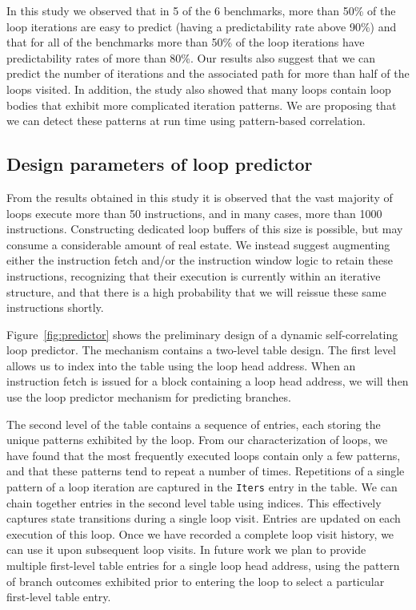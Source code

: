 \documentclass[times,10pt,twocolumn]{article}
\begin{document}
In this study we observed that in 5 of the 6 benchmarks, more than 
50\% of the loop iterations are easy to predict (having a predictability rate 
above 90\%) and that for all of the benchmarks more than 50\%
of the loop iterations have predictability rates of more than 80\%. Our 
results also suggest that we can predict the number of iterations
and the associated path for more than half of the loops visited.  
In addition, the study also showed that many loops contain loop bodies
that exhibit more complicated iteration patterns.  We are proposing 
that we can detect these patterns at run time using pattern-based
correlation.

\subsection{Design parameters of loop predictor} 

From the results obtained in this study it is observed that the vast 
majority of loops execute more than 50 instructions, and in many cases,
more than 1000 instructions. Constructing dedicated loop buffers of 
this size is possible, but may consume a considerable amount of real estate.
We instead suggest augmenting either the instruction fetch and/or the instruction
window logic to retain these instructions, recognizing that their execution is 
currently within an iterative structure, and that there is a high probability
that we will reissue these same instructions shortly.  

Figure~\ref{fig:predictor} shows the preliminary design of a dynamic self-correlating
loop predictor.  The mechanism contains a two-level table design.   The first level
allows us to index into the table using the loop head address.  When an instruction
fetch is issued for a block containing a loop head address, we will then use the
loop predictor mechanism for predicting branches.

The second level of the table contains a sequence of entries, each storing the
unique patterns exhibited by the loop.  From our characterization of loops, we have
found that the most frequently executed loops contain only a few patterns, and that
these patterns tend to repeat a number of times.  Repetitions of a single pattern of a loop iteration 
are captured in the {\tt Iters} entry in the table.   We can chain together entries in the second
level table using indices.  This effectively captures state transitions during
a single loop visit.  
Entries are updated on each execution
of this loop.   Once we have recorded a complete loop visit history, we
can use it upon subsequent
loop visits.
In future work we plan to provide multiple first-level table entries for a single loop head address, 
using the pattern of branch outcomes exhibited prior to entering the loop to select
a particular first-level table entry.
\end{document}
